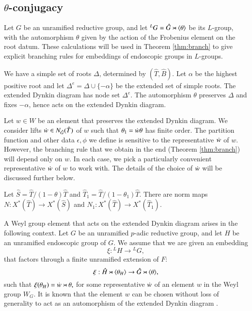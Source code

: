 \subsection{$\theta$-conjugacy}

Let $G$ be an unramified reductive group, and let ${}^LG = \hat G
\rtimes \langle{\theta}\rangle$ be its $L$-group, with the automorphism $\theta$
given by the action of the Frobenius element on the root datum.  
These calculations will be used in Theorem
\ref{thm:branch} to give explicit branching rules for embeddings of
endoscopic groups in $L$-groups.

We have a simple set of roots $\Delta$, determined by $(\hat T,\hat
B)$.  Let $\alpha$ be the highest positive root and let $\Delta^e =
\Delta \cup \{-\alpha\}$ be the extended set of simple roots.  The
extended Dynkin diagram has node set $\Delta^e$.  The automorphism
$\theta$ preserves $\Delta$ and fixes $-\alpha$, hence acts on the
extended Dynkin diagram.

Let $w\in W$ be an element that preserves the extended Dynkin diagram.
We consider lifts $\dot w\in N_{\hat G}(\hat T)$ of $w$ such that
$\theta_1 = \dot w \theta$ has finite order.  The partition function
and other data $\epsilon,\phi$ we define is sensitive to the
representative $\dot w$ of $w$.  However, the branching rule that we
obtain in the end (Theorem \ref{thm:branch}) will depend only on $w$.
In each case, we pick a particularly convenient representative $\dot w$
of $w$ to work with.  The details of the choice of $\dot w$ will be
discussed further below.

Let $\hat S = \hat T/(1-\theta)\hat T$ and $\hat T_1 = \hat
T/(1-\theta_1)\hat T$.  There are norm maps $N:X^*(\hat T)\to X^*(\hat
S)$ and $N_1:X^*(\hat T)\to X^*(\hat T_1)$.

A Weyl group element that acts on the extended Dynkin diagram arises
in the following context.  Let $G$ be an unramified $p$-adic reductive
group, and let $H$ be an unramified endoscopic group of $G$.  We
assume that we are given an embedding
\[
\xi:{}^LH\to {}^LG,
\]
that factors through a finite unramified extension of $F$:
\[
\xi:\hat H\rtimes \langle{\theta_H}\rangle\to \hat G\rtimes \langle{\theta}\rangle,
\]
such that $\xi(\theta_H) = \dot w \rtimes \theta,$ for some
representative $\dot w $ of an element $w$ in the Weyl group $W_G$.  It
is known that the element $w$ can be chosen without loss of generality
to act as an automorphism of the extended Dynkin diagram
\cite[\S4.7]{hales1993simple}.

